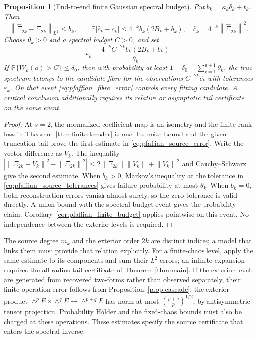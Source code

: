 \documentclass[11pt,a4paper]{amsart}
\numberwithin{equation}{section}
\newtheorem{proposition}[theorem]{Proposition}
\theoremstyle{definition}
\theoremstyle{remark}
\newcommand{\E}{\mathbb E}
\newcommand{\Prob}{\mathbb P}
\newcommand{\norm}[1]{\left\lVert#1\right\rVert}
\begin{document}
\begin{proposition}[End-to-end finite Gaussian spectral budget]\label{prop:pfaffian_source_budget}
Put $b_k=\kappa_k\delta_k+t_k$. Then
\begin{equation}\label{eq:pfaffian_source_error}
 \norm{\widehat\Xi_{2k}-\Xi_{2k}}_{L^2}\le b_k,\qquad
 \E|\widehat c_k-c_k|\le4^{-k}b_k(2B_k+b_k),
 \quad\widehat c_k=4^{-k}\norm{\widehat\Xi_{2k}}^2.
\end{equation}
Choose $\theta_k>0$ and a spectral budget $C>0$, and set
\begin{equation}\label{eq:pfaffian_source_tolerances}
 \varepsilon_k=\frac{4^{-k}C^{-2k}b_k(2B_k+b_k)}{\theta_k}.
\end{equation}
If $\Prob\{W_\rho(a)>C\}\le\delta_0$, then with probability at least
$1-\delta_0-\sum_{k=1}^{n+1}\theta_k$, the true spectrum belongs to the candidate fibre for the observations $C^{-2k}\widehat c_k$ with tolerances $\varepsilon_k$. On that event \eqref{eq:pfaffian_fibre_error} controls every fitting candidate. A critical conclusion additionally requires its relative or asymptotic tail certificate on the same event.
\end{proposition}
\begin{proof}
At $s=2$, the normalized coefficient map is an isometry and the finite rank loss in Theorem~\ref{thm:finitedecoder} is one. Its noise bound and the given truncation tail prove the first estimate in \eqref{eq:pfaffian_source_error}. Write the vector difference as $V_k$. The inequality
$|\norm{\Xi_{2k}+V_k}^2-\norm{\Xi_{2k}}^2|
 \le2\norm{\Xi_{2k}}\norm{V_k}+\norm{V_k}^2$
and Cauchy--Schwarz give the second estimate. When $b_k>0$, Markov's inequality at the tolerance in \eqref{eq:pfaffian_source_tolerances} gives failure probability at most $\theta_k$. When $b_k=0$, both reconstruction errors vanish almost surely, so the zero tolerance is valid directly. A union bound with the spectral-budget event gives the probability claim. Corollary~\ref{cor:pfaffian_finite_budget} applies pointwise on this event. No independence between the exterior levels is required.
\end{proof}

The source degree $m_k$ and the exterior order $2k$ are distinct indices; a model that links them must provide that relation explicitly. For a finite-chaos level, apply the same estimate to its components and sum their $L^2$ errors; an infinite expansion requires the all-radius tail certificate of Theorem~\ref{thm:main}. If the exterior levels are generated from recovered two-forms rather than observed separately, their finite-operation error follows from Proposition~\ref{prop:cascade}: the exterior product
$\wedge^pE\times\wedge^qE\to\wedge^{p+q}E$
has norm at most $\binom{p+q}p^{1/2}$, by antisymmetric tensor projection. Probability H\"older and the fixed-chaos bounds must also be charged at these operations. These estimates specify the source certificate that enters the spectral inverse.
\end{document}
